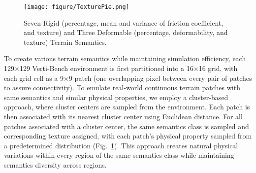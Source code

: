 \begin{figure}[h]
    \centering
    \texttt{[image: figure/TexturePie.png]}
    \caption{Seven Rigid (percentage, mean and variance of friction coefficient, and texture) and Three Deformable (percentage, deformability, and texture) Terrain Semantics.} 
    \label{fig::semantics}
\end{figure}

To create various terrain semantics while maintaining simulation efficiency, each 129$\times$129 Verti-Bench environment is first partitioned into a 16$\times$16 grid, with each grid cell as a 9$\times$9 patch (one overlapping pixel between every pair of patches to assure connectivity).  
To emulate real-world continuous terrain patches with same semantics and similar physical properties, we employ a cluster-based approach, where cluster centers are sampled from the environment. 
Each patch is then associated with its nearest cluster center using Euclidean distance. For all patches associated with a cluster center, the same semantics class is sampled and corresponding texture assigned, with each patch's physical property sampled from a predetermined distribution (Fig.~\ref{fig::semantics}). 
This approach creates natural physical variations within every region of the same semantics class while maintaining semantics diversity across regions. 



